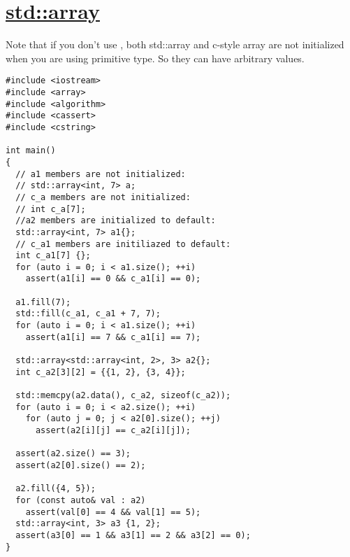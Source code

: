\documentclass{book}
\begin{document}
	\section{\href{https://en.cppreference.com/w/cpp/container/array}{std::array}}
	Note that if you don't use ${}$, both std::array and c-style array are not initialized when you are using primitive type. So they can have arbitrary values.
	\begin{lstlisting}
#include <iostream>
#include <array>
#include <algorithm>
#include <cassert>
#include <cstring>

int main()
{
  // a1 members are not initialized:
  // std::array<int, 7> a;
  // c_a members are not initialized:
  // int c_a[7];
  //a2 members are initialized to default:
  std::array<int, 7> a1{};
  // c_a1 members are initiliazed to default:
  int c_a1[7] {};
  for (auto i = 0; i < a1.size(); ++i)
    assert(a1[i] == 0 && c_a1[i] == 0);

  a1.fill(7);
  std::fill(c_a1, c_a1 + 7, 7);
  for (auto i = 0; i < a1.size(); ++i)
    assert(a1[i] == 7 && c_a1[i] == 7);

  std::array<std::array<int, 2>, 3> a2{};
  int c_a2[3][2] = {{1, 2}, {3, 4}};

  std::memcpy(a2.data(), c_a2, sizeof(c_a2));
  for (auto i = 0; i < a2.size(); ++i)
    for (auto j = 0; j < a2[0].size(); ++j)
      assert(a2[i][j] == c_a2[i][j]);

  assert(a2.size() == 3);
  assert(a2[0].size() == 2);

  a2.fill({4, 5});
  for (const auto& val : a2)
    assert(val[0] == 4 && val[1] == 5);
  std::array<int, 3> a3 {1, 2};
  assert(a3[0] == 1 && a3[1] == 2 && a3[2] == 0);
}
	\end{lstlisting}
\end{document}
